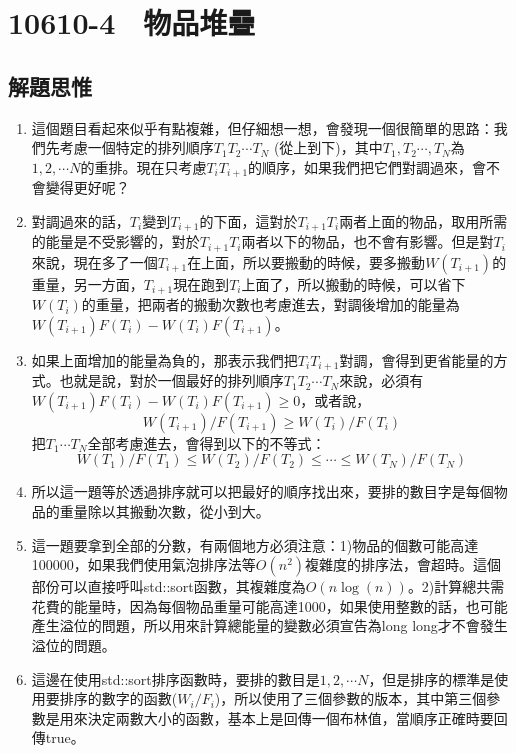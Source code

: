 \section{10610-4　物品堆疊}

\subsection{解題思惟}
\begin{enumerate}
	\item 這個題目看起來似乎有點複雜，但仔細想一想，會發現一個很簡單的思路：我們先考慮一個特定的排列順序$T_1T_2\cdots T_N$ (從上到下)，其中$T_1, T_2\cdots,T_N$為$1,2,\cdots N$的重排。現在只考慮$T_iT_{i+1}$的順序，如果我們把它們對調過來，會不會變得更好呢？
	\item 對調過來的話，$T_i$變到$T_{i+1}$的下面，這對於$T_{i+1}T_i$兩者上面的物品，取用所需的能量是不受影響的，對於$T_{i+1}T_i$兩者以下的物品，也不會有影響。但是對$T_i$來說，現在多了一個$T_{i+1}$在上面，所以要搬動的時候，要多搬動$W(T_{i+1})$的重量，另一方面，$T_{i+1}$現在跑到$T_i$上面了，所以搬動的時候，可以省下$W(T_i)$的重量，把兩者的搬動次數也考慮進去，對調後增加的能量為$W(T_{i+1})F(T_i)-W(T_i)F(T_{i+1})$。
	\item 如果上面增加的能量為負的，那表示我們把$T_iT_{i+1}$對調，會得到更省能量的方式。也就是說，對於一個最好的排列順序$T_1T_2\cdots T_N$來說，必須有$W(T_{i+1})F(T_i)-W(T_i)F(T_{i+1})\ge 0$，或者說，
	$$W(T_{i+1})/F(T_{i+1}) \ge W(T_i)/F(T_i)$$
	把$T_1\cdots T_N$全部考慮進去，會得到以下的不等式：
	$$W(T_1)/F(T_1)\le W(T_2)/F(T_2)\le\cdots\le W(T_N)/F(T_N)$$
	\item 所以這一題等於透過排序就可以把最好的順序找出來，要排的數目字是每個物品的重量除以其搬動次數，從小到大。
	\item 這一題要拿到全部的分數，有兩個地方必須注意：1)物品的個數可能高達100000，如果我們使用氣泡排序法等$O(n^2)$複雜度的排序法，會超時。這個部份可以直接呼叫std::sort函數，其複雜度為$O(n\log(n))$。2)計算總共需花費的能量時，因為每個物品重量可能高達1000，如果使用整數的話，也可能產生溢位的問題，所以用來計算總能量的變數必須宣告為long long才不會發生溢位的問題。
	\item 這邊在使用std::sort排序函數時，要排的數目是$1,2,\cdots N$，但是排序的標準是使用要排序的數字的函數($W_i/F_i$)，所以使用了三個參數的版本，其中第三個參數是用來決定兩數大小的函數，基本上是回傳一個布林值，當順序正確時要回傳true。
\end{enumerate}

